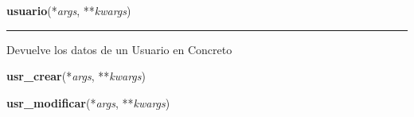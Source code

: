     \label{app:views:usuario}

    \vspace{0.5ex}

\hspace{.8\funcindent}\begin{boxedminipage}{\funcwidth}

    \raggedright \textbf{usuario}(*\textit{args}, **\textit{kwargs})

    \vspace{-1.5ex}

    \rule{\textwidth}{0.5\fboxrule}
\setlength{\parskip}{2ex}
    Devuelve los datos de un Usuario en Concreto

\setlength{\parskip}{1ex}
    \end{boxedminipage}

    \label{app:views:usr_crear}

    \vspace{0.5ex}

\hspace{.8\funcindent}\begin{boxedminipage}{\funcwidth}

    \raggedright \textbf{usr\_crear}(*\textit{args}, **\textit{kwargs})

\setlength{\parskip}{2ex}
\setlength{\parskip}{1ex}
    \end{boxedminipage}

    \label{app:views:usr_modificar}

    \vspace{0.5ex}

\hspace{.8\funcindent}\begin{boxedminipage}{\funcwidth}

    \raggedright \textbf{usr\_modificar}(*\textit{args}, **\textit{kwargs})

\setlength{\parskip}{2ex}
\setlength{\parskip}{1ex}
    \end{boxedminipage}

    \label{app:views:usr_eliminar}

    \vspace{0.5ex}

